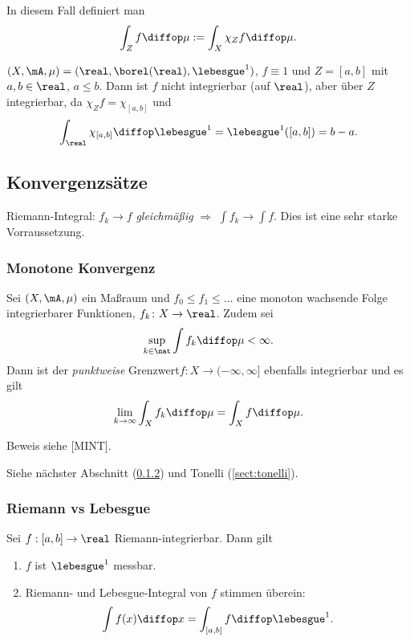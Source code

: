  In diesem Fall definiert man
 \[ \int_Z f \diffop \mu := \int_X \chi_Z f \diffop \mu. \]

\begin{exmp}
 $(X,\mA,\mu) = (\real, \borel(\real), \lebesgue^1 )$, $f \equiv 1$ und $Z = [a,b]$ mit $a,b \in \real$, $a \le b$. Dann ist $f$ nicht integrierbar (auf $\real$), aber über $Z$ integrierbar, da $\chi_Z f = \chi_{[a,b]}$ und
 \[ \int_\real \chi_{[a,b]} \diffop \lebesgue^1 = \lebesgue^1( [a,b] ) = b - a. \]
\end{exmp}

\subsection{Konvergenzsätze}
 Riemann-Integral: $f_k \to f$ \emph{gleichmäßig} $\Rightarrow$ $\int f_k \to \int f$. Dies ist eine sehr starke Vorraussetzung.
 
\subsubsection{Monotone Konvergenz}
\begin{thm}
 Sei $(X,\mA,\mu)$ ein Maßraum und $f_0 \le f_1 \le \ldots$ eine monoton wachsende Folge integrierbarer Funktionen, $f_k \colon X \to \real$. Zudem sei
 \[ \sup_{k \in \nat} \int f_k \diffop \mu < \infty. \]
 Dann ist der \emph{punktweise} Grenzwert\footnotemark $f\colon X \to (-\infty, \infty]$ ebenfalls integrierbar und es gilt
 \[ \lim_{k \to \infty} \int_X f_k \diffop \mu = \int_X f \diffop \mu. \]
\end{thm}

Beweis siehe [MINT].

\begin{exmp}
 Siehe nächster Abschnitt (\ref{sect:riemann-lebesgue}) und Tonelli (\ref{sect:tonelli}).
\end{exmp}

\subsubsection{Riemann vs Lebesgue}\label{sect:riemann-lebesgue}
\begin{kor}
 Sei $f:[a,b] \to \real$ Riemann-integrierbar. Dann gilt
 \begin{enumerate}
  \item $f$ ist $\lebesgue^1$ messbar.
  \item Riemann- und Lebesgue-Integral von $f$ stimmen überein:
   \[ \int f(x) \diffop x = \int_{[a,b]} f \diffop \lebesgue^1. \]
 \end{enumerate}
\end{kor}

